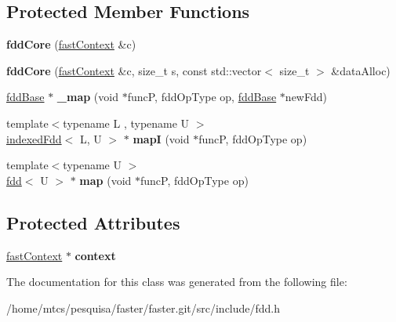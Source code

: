 \subsection*{Protected Member Functions}
\begin{DoxyCompactItemize}
\item 
\hypertarget{classfaster_1_1fddCore_af2bf966f3d75e2d7d0d81f120fb7599a}{}{\bfseries fdd\+Core} (\hyperlink{classfaster_1_1fastContext}{fast\+Context} \&c)\label{classfaster_1_1fddCore_af2bf966f3d75e2d7d0d81f120fb7599a}

\item 
\hypertarget{classfaster_1_1fddCore_a437156da84fb4f0e7cb58f2f67ff172b}{}{\bfseries fdd\+Core} (\hyperlink{classfaster_1_1fastContext}{fast\+Context} \&c, size\+\_\+t s, const std\+::vector$<$ size\+\_\+t $>$ \&data\+Alloc)\label{classfaster_1_1fddCore_a437156da84fb4f0e7cb58f2f67ff172b}

\item 
\hypertarget{classfaster_1_1fddCore_a1fff34f140b7634b1a6e60b8069a3a29}{}\hyperlink{classfaster_1_1fddBase}{fdd\+Base} $\ast$ {\bfseries \+\_\+map} (void $\ast$func\+P, fdd\+Op\+Type op, \hyperlink{classfaster_1_1fddBase}{fdd\+Base} $\ast$new\+Fdd)\label{classfaster_1_1fddCore_a1fff34f140b7634b1a6e60b8069a3a29}

\item 
\hypertarget{classfaster_1_1fddCore_a87e8b9e76ef7138a1394265528944ffe}{}{\footnotesize template$<$typename L , typename U $>$ }\\\hyperlink{classfaster_1_1indexedFdd}{indexed\+Fdd}$<$ L, U $>$ $\ast$ {\bfseries map\+I} (void $\ast$func\+P, fdd\+Op\+Type op)\label{classfaster_1_1fddCore_a87e8b9e76ef7138a1394265528944ffe}

\item 
\hypertarget{classfaster_1_1fddCore_a30e174ccee6fc2d00387c85161422825}{}{\footnotesize template$<$typename U $>$ }\\\hyperlink{classfaster_1_1fdd}{fdd}$<$ U $>$ $\ast$ {\bfseries map} (void $\ast$func\+P, fdd\+Op\+Type op)\label{classfaster_1_1fddCore_a30e174ccee6fc2d00387c85161422825}

\end{DoxyCompactItemize}
\subsection*{Protected Attributes}
\begin{DoxyCompactItemize}
\item 
\hypertarget{classfaster_1_1fddCore_aa2bf63bd5c77afe78061ed4df3713a76}{}\hyperlink{classfaster_1_1fastContext}{fast\+Context} $\ast$ {\bfseries context}\label{classfaster_1_1fddCore_aa2bf63bd5c77afe78061ed4df3713a76}

\end{DoxyCompactItemize}


The documentation for this class was generated from the following file\+:\begin{DoxyCompactItemize}
\item 
/home/mtcs/pesquisa/faster/faster.\+git/src/include/fdd.\+h\end{DoxyCompactItemize}
